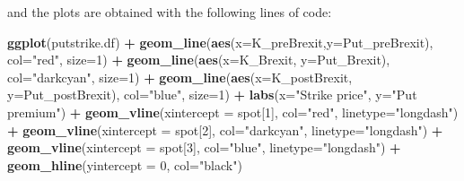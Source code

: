 \documentclass[]{book}
\newenvironment{Shaded}{\begin{snugshade}}{\end{snugshade}}
\newcommand{\KeywordTok}[1]{\textcolor[rgb]{0.13,0.29,0.53}{\textbf{#1}}}
\newcommand{\DataTypeTok}[1]{\textcolor[rgb]{0.13,0.29,0.53}{#1}}
\newcommand{\DecValTok}[1]{\textcolor[rgb]{0.00,0.00,0.81}{#1}}
\newcommand{\StringTok}[1]{\textcolor[rgb]{0.31,0.60,0.02}{#1}}
\newcommand{\OperatorTok}[1]{\textcolor[rgb]{0.81,0.36,0.00}{\textbf{#1}}}
\newcommand{\NormalTok}[1]{#1}
\theoremstyle{definition}
\theoremstyle{definition}
\theoremstyle{definition}
\theoremstyle{remark}
\begin{document}
and the plots are obtained with the following lines of code:

\begin{Shaded}
\begin{Highlighting}[]
\KeywordTok{ggplot}\NormalTok{(putstrike.df) }\OperatorTok{+}\StringTok{ }\KeywordTok{geom_line}\NormalTok{(}\KeywordTok{aes}\NormalTok{(}\DataTypeTok{x=}\NormalTok{K_preBrexit,}\DataTypeTok{y=}\NormalTok{Put_preBrexit), }\DataTypeTok{col=}\StringTok{"red"}\NormalTok{, }\DataTypeTok{size=}\DecValTok{1}\NormalTok{) }\OperatorTok{+}\StringTok{ }
\StringTok{  }\KeywordTok{geom_line}\NormalTok{(}\KeywordTok{aes}\NormalTok{(}\DataTypeTok{x=}\NormalTok{K_Brexit, }\DataTypeTok{y=}\NormalTok{Put_Brexit), }\DataTypeTok{col=}\StringTok{"darkcyan"}\NormalTok{, }\DataTypeTok{size=}\DecValTok{1}\NormalTok{) }\OperatorTok{+}
\StringTok{  }\KeywordTok{geom_line}\NormalTok{(}\KeywordTok{aes}\NormalTok{(}\DataTypeTok{x=}\NormalTok{K_postBrexit, }\DataTypeTok{y=}\NormalTok{Put_postBrexit), }\DataTypeTok{col=}\StringTok{"blue"}\NormalTok{, }\DataTypeTok{size=}\DecValTok{1}\NormalTok{) }\OperatorTok{+}
\StringTok{  }\KeywordTok{labs}\NormalTok{(}\DataTypeTok{x=}\StringTok{"Strike price"}\NormalTok{, }\DataTypeTok{y=}\StringTok{"Put premium"}\NormalTok{) }\OperatorTok{+}\StringTok{ }
\StringTok{  }\KeywordTok{geom_vline}\NormalTok{(}\DataTypeTok{xintercept =}\NormalTok{ spot[}\DecValTok{1}\NormalTok{], }\DataTypeTok{col=}\StringTok{"red"}\NormalTok{, }\DataTypeTok{linetype=}\StringTok{"longdash"}\NormalTok{) }\OperatorTok{+}\StringTok{ }
\StringTok{  }\KeywordTok{geom_vline}\NormalTok{(}\DataTypeTok{xintercept =}\NormalTok{ spot[}\DecValTok{2}\NormalTok{], }\DataTypeTok{col=}\StringTok{"darkcyan"}\NormalTok{, }\DataTypeTok{linetype=}\StringTok{"longdash"}\NormalTok{) }\OperatorTok{+}
\StringTok{  }\KeywordTok{geom_vline}\NormalTok{(}\DataTypeTok{xintercept =}\NormalTok{ spot[}\DecValTok{3}\NormalTok{], }\DataTypeTok{col=}\StringTok{"blue"}\NormalTok{, }\DataTypeTok{linetype=}\StringTok{"longdash"}\NormalTok{) }\OperatorTok{+}
\StringTok{  }\KeywordTok{geom_hline}\NormalTok{(}\DataTypeTok{yintercept =} \DecValTok{0}\NormalTok{, }\DataTypeTok{col=}\StringTok{"black"}\NormalTok{)}
\end{Highlighting}
\end{Shaded}
\end{document}
